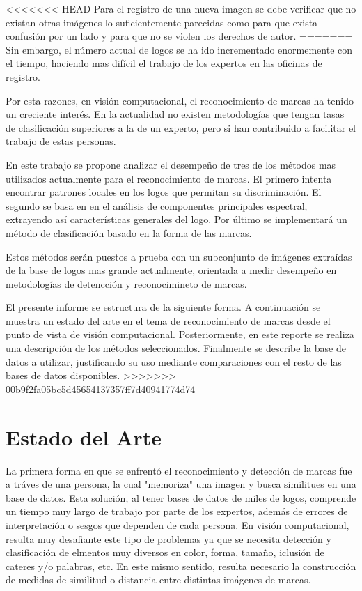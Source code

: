 \documentclass[conference]{IEEEtran}
\begin{document}
<<<<<<< HEAD
Para el registro de una nueva imagen se debe verificar que no existan otras imágenes lo suficientemente parecidas como para que exista confusión por un lado y para que no se violen los derechos de autor. 
=======
Sin embargo, el número actual de logos se ha ido incrementado enormemente con el tiempo, haciendo mas difícil el trabajo de los expertos en las oficinas de registro. 

Por esta razones, en visión computacional, el reconocimiento de marcas ha tenido un creciente interés. En la actualidad no existen metodologías que tengan tasas de clasificación superiores a la de un experto, pero si han contribuido a facilitar el trabajo de estas personas.

En este trabajo se propone analizar el desempeño de tres de los métodos mas utilizados actualmente para el reconocimiento de marcas. El primero intenta encontrar patrones locales en los logos que permitan su discriminación. El segundo se basa en en el análisis de componentes principales espectral, extrayendo así características generales del logo. Por último se implementará un método de clasificación basado en la forma de las marcas.

Estos métodos serán puestos a prueba con un subconjunto de imágenes extraídas de la base de logos mas grande actualmente, orientada a medir desempeño en metodologías de detencción y reconocimineto de marcas.

El presente informe se estructura de la siguiente forma. A continuación se muestra un estado del arte en el tema de reconocimiento de marcas desde el punto de vista de visión computacional. Posteriormente, en este reporte se realiza una descripción de los métodos seleccionados. Finalmente se describe la base de datos a utilizar, justificando su uso mediante comparaciones con el resto de las bases de datos disponibles.
>>>>>>> 00b9f2fa05bc5d45654137357ff7d40941774d74


\section{Estado del Arte}
La primera forma en que se enfrentó el reconocimiento y detección de marcas fue a tráves de una persona, la cual "memoriza" una imagen y busca similitues en una base de datos. Esta solución, al tener bases de datos de miles de logos, comprende un tiempo muy largo de trabajo por parte de los expertos, además de errores de interpretación o sesgos que dependen de cada persona.
En visión computacional, resulta muy desafiante este tipo de problemas ya que se necesita detección y clasificación de elmentos muy diversos en color, forma, tamaño, iclusión de cateres y/o palabras, etc. En este mismo sentido, resulta necesario la construcción de medidas de similitud o distancia entre distintas imágenes de marcas.
\end{document}
